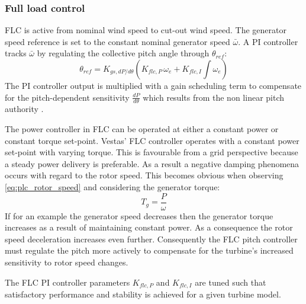 \subsubsection{Full load control}
FLC is active from nominal wind speed to cut-out wind speed. The generator speed reference is set to the constant nominal generator speed $ \bar{\omega} $. A PI controller tracks $ \bar{\omega} $ by regulating the collective pitch angle through $ \theta_{ref} $:
\begin{equation}\label{eq:pi_flc_ctrl}
	\theta_{ref} = K_{gs,dP/d\theta} \left(K_{flc,P} \, \omega_e + K_{flc,I} \int \omega_e\right)
\end{equation}
The PI controller output is multiplied with a gain scheduling term to compensate for the pitch-dependent sensitivity $ \frac{dP}{d\theta} $ which results from the non linear pitch authority \cite{Pao2009}. 

The power controller in FLC can be operated at either a constant power or constant torque set-point. Vestas' FLC controller operates with a constant power set-point with varying torque. This is favourable from a grid perspective because a steady power delivery is preferable. As a result a negative damping phenomena occurs with regard to the rotor speed. This becomes obvious when observing \cref{eq:plc_rotor_speed} and considering the generator torque:
\begin{equation}\label{eq:gen_torque}
	T_g = \dfrac{P}{\omega}
\end{equation}
If for an example the generator speed decreases then the generator torque increases as a result of maintaining constant power. As a consequence the rotor speed deceleration increases even further. Consequently the FLC pitch controller must regulate the pitch more actively to compensate for the turbine's increased sensitivity to rotor speed changes.

The FLC PI controller parameters $ K_{flc,P} $ and $ K_{flc,I} $ are tuned such that satisfactory performance and stability is achieved for a given turbine model. 


